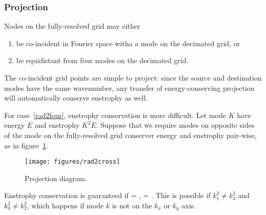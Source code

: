 \documentclass[10pt,showpacs,showkeys,%
amsfonts,amsmath,onecolumn,
floatfix,aps,superscriptaddress]{revtex4}
\begin{document}
\subsubsection{Projection}
Nodes on the fully-resolved grid may either
\begin{enumerate}
\item \label{rad2co}
  be co-incident in Fourier space witha a mode on the decimated grid, or
\item \label{rad2four}
  be equidistant from four modes on the decimated grid.
\end{enumerate}
The co-incident grid points are simple to project: since the source
and destination modes have the same wavenumber, any transfer of
energy-conserving projection will automatically conserve enstrophy as
well.

For case~\ref{rad2four}, enstrophy conservation is more difficult.
Let mode $K$ have energy $E$ and enstrophy $K^2E$.  Suppose that we
require modes on opposite sides of the mode on the fully-resolved grid
conserver energy and enstrophy pair-wise, as in figure~\ref{rad2cross}. 
\begin{figure}[htb]
  \begin{center}
    \texttt{[image: figures/rad2cross]}
    \caption{Projection diagram.}
    \label{rad2cross}
  \end{center}
\end{figure}
Enstrophy conservation is guaranteed if 
\bec
\alpha = ,
\quad
\beta = .
\eec
This is possible if $k_1^2 \neq k_3^2$ and $k_0^2 \neq k_2^2$, which
happens if mode $k$ is not on the $k_x$ or $k_y$ axis. %
\end{document}
